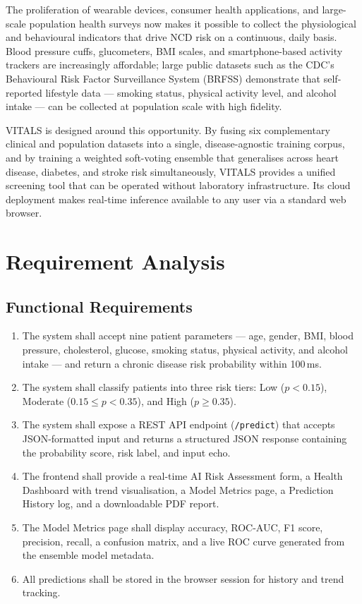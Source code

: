 \documentclass[12pt,a4paper]{report}
\begin{document}
The proliferation of wearable devices, consumer health applications, and large-scale population health surveys now makes it possible to collect the physiological and behavioural indicators that drive NCD risk on a continuous, daily basis. Blood pressure cuffs, glucometers, BMI scales, and smartphone-based activity trackers are increasingly affordable; large public datasets such as the CDC's Behavioural Risk Factor Surveillance System (BRFSS) demonstrate that self-reported lifestyle data — smoking status, physical activity level, and alcohol intake — can be collected at population scale with high fidelity.

VITALS is designed around this opportunity. By fusing six complementary clinical and population datasets into a single, disease-agnostic training corpus, and by training a weighted soft-voting ensemble that generalises across heart disease, diabetes, and stroke risk simultaneously, VITALS provides a unified screening tool that can be operated without laboratory infrastructure. Its cloud deployment makes real-time inference available to any user via a standard web browser.

\section{Requirement Analysis}

\subsection{Functional Requirements}

\begin{enumerate}[leftmargin=*]
  \item The system shall accept nine patient parameters — age, gender, BMI, blood pressure, cholesterol, glucose, smoking status, physical activity, and alcohol intake — and return a chronic disease risk probability within 100\,ms.
  \item The system shall classify patients into three risk tiers: Low ($p < 0.15$), Moderate ($0.15 \le p < 0.35$), and High ($p \ge 0.35$).
  \item The system shall expose a REST API endpoint (\texttt{/predict}) that accepts JSON-formatted input and returns a structured JSON response containing the probability score, risk label, and input echo.
  \item The frontend shall provide a real-time AI Risk Assessment form, a Health Dashboard with trend visualisation, a Model Metrics page, a Prediction History log, and a downloadable PDF report.
  \item The Model Metrics page shall display accuracy, ROC-AUC, F1 score, precision, recall, a confusion matrix, and a live ROC curve generated from the ensemble model metadata.
  \item All predictions shall be stored in the browser session for history and trend tracking.
\end{enumerate}
\end{document}
